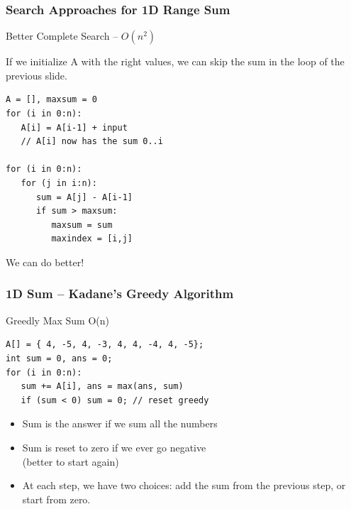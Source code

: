 \documentclass{beamer}
\begin{document}
\begin{frame}
  \frametitle{Search Approaches for 1D Range Sum}
  \begin{block}{Better Complete Search -- $O(n^2)$}

    If we initialize A with the right values, we can skip the sum in
    the loop of the previous slide.

{\smaller
\begin{verbatim}
A = [], maxsum = 0
for (i in 0:n):
   A[i] = A[i-1] + input
   // A[i] now has the sum 0..i

for (i in 0:n):
   for (j in i:n):
      sum = A[j] - A[i-1]
      if sum > maxsum:
         maxsum = sum
         maxindex = [i,j]
\end{verbatim}
}
  \end{block}

  We can do better!
\end{frame}

\begin{frame}
  \frametitle{1D Sum -- Kadane's Greedy Algorithm}
  \begin{block}{Greedly Max Sum O(n)}
      {\smaller
\begin{verbatim}
A[] = { 4, -5, 4, -3, 4, 4, -4, 4, -5};
int sum = 0, ans = 0;
for (i in 0:n):
   sum += A[i], ans = max(ans, sum)
   if (sum < 0) sum = 0; // reset greedy
\end{verbatim}
      }
  \end{block}

\begin{itemize}
\item Sum is the answer if we sum all the numbers
\item Sum is reset to zero if we ever go negative\\
  (better to start again)
\item At each step, we have two choices: add the sum from the previous
  step, or start from zero.
\end{itemize}
\end{frame}
\end{document}
